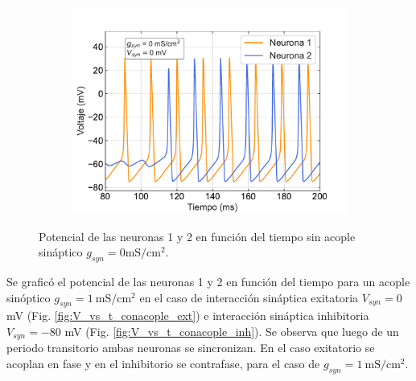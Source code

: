 \documentclass[11pt,twocolumn,twoside]{opticajnl}
\begin{document}
\begin{figure}[ht]
    \centering
         \begin{subfigure}[b]{\linewidth}
            \includegraphics[width=\textwidth]{Figuras/V_vs_t_0_0.pdf}
         \end{subfigure}
    \caption{Potencial de las neuronas 1 y 2 en función del tiempo sin acople sináptico $g_{syn} = 0 \text{mS}/\text{cm}^2$.} 
    \label{fig:V_vs_t_sinacople}
\end{figure}

Se graficó el potencial de las neuronas 1 y 2 en función del tiempo para un acople sinóptico $g_{syn} = 1~\text{mS}/\text{cm}^2$ en el caso de interacción sináptica exitatoria $V_{syn}=0 $ mV (Fig. \ref{fig:V_vs_t_conacople_ext}) e interacción sináptica inhibitoria $V_{syn}= -80$ mV (Fig. \ref{fig:V_vs_t_conacople_inh}). Se observa que luego de un periodo transitorio ambas neuronas se sincronizan. En el caso exitatorio se acoplan en fase y en el inhibitorio se contrafase, para el caso de $g_{syn} = 1 ~\text{mS}/\text{cm}^2$.
\end{document}
